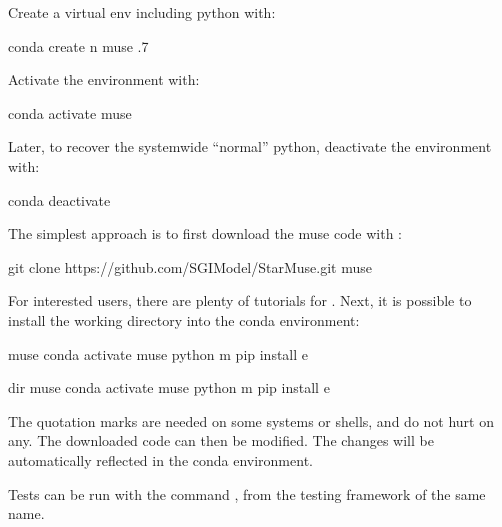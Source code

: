 \documentclass[letterpaper,10pt,english]{sphinxmanual}
\begin{document}
Create a virtual env including python with:

\begin{sphinxVerbatim}[commandchars=\\\{\}]
conda create \PYGZhy{}n muse .7
\end{sphinxVerbatim}

Activate the environment with:

\begin{sphinxVerbatim}[commandchars=\\\{\}]
conda activate muse
\end{sphinxVerbatim}

Later, to recover the system\sphinxhyphen{}wide “normal” python, deactivate the environment with:

\begin{sphinxVerbatim}[commandchars=\\\{\}]
conda deactivate
\end{sphinxVerbatim}

The simplest approach is to first download the muse code with :

\begin{sphinxVerbatim}[commandchars=\\\{\}]
git clone https://github.com/SGIModel/StarMuse.git muse
\end{sphinxVerbatim}

For interested users, there are plenty of  tutorials for .
Next, it is possible to install the working directory into the conda environment:

\begin{sphinxVerbatim}[commandchars=\\\{\}]
 muse
conda activate muse
python \PYGZhy{}m pip install \PYGZhy{}e 

dir muse
conda activate muse
python \PYGZhy{}m pip install \PYGZhy{}e 
\end{sphinxVerbatim}

The quotation marks are needed on some systems or shells, and do not hurt on any. The
downloaded code can then be modified. The changes will be automatically reflected in the
conda environment.

Tests can be run with the command , from the testing framework of the same name.
\end{document}
